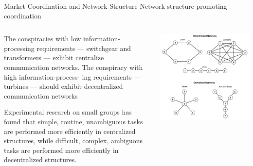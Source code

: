 \documentclass[aspectratio=1610]{beamer}
\begin{document}
\begin{frame}{Market Coordination and Network Structure}
	{Network structure promoting coordination}

	\small

	\begin{columns}
			\begin{column}{0.5\textwidth}



		\begin{tcolorbox}[
			colback=base_c!5!white,
			colframe=base_c!90!black,
			title={\centering Proposition 2}]
			\footnotesize The conspiracies with low information-processing 
			requirements --- switchgear and transformers --- 
			exhibit centralize communication networks.
			The conspiracy with high information-process- ing
			requirements --- turbines --- should exhibit decentralized
			communication networks \end{tcolorbox}

		\pause

		\begin{tcolorbox}[
			colback=comp_c!5!white,
			colframe=comp_c!90!black,
			title={\centering \small Argument for Proposition 2}]
			\footnotesize Experimental research on small groups has found that 
			simple, routine, unambiguous tasks are performed more 
			efficiently in centralized structures, while difficult, 
			complex, ambiguous tasks are performed more efficiently 
			in decentralized structures.
		\end{tcolorbox}

		\end{column}

		\pause

		\begin{column}{0.5\textwidth}
			\includegraphics[width=1\textwidth]{images/centralization}


\end{column}
\end{columns}
\end{frame}
\end{document}
